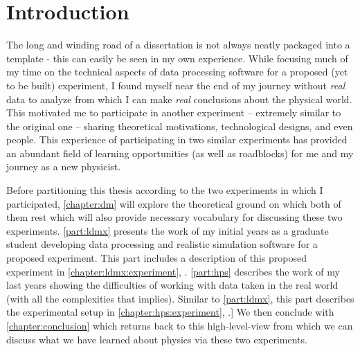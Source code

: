 \chapter{Introduction}
\label{chapter:intro}

The long and winding road of a dissertation is not always neatly packaged into a
template - this can easily be seen in my own experience. While focusing much
of my time on the technical aspects of data processing software for a proposed (yet
to be built) experiment, I found myself near the end of my journey without \emph{real}
data to analyze from which I can make \emph{real} conclusions about the physical world.
This motivated me to participate in another experiment -- extremely similar to the original
one -- sharing theoretical motivations, technological designs, and even people. This
experience of participating in two similar experiments has provided an abundant
field of learning opportunities (as well as roadblocks) for me and my journey as a new physicist.

Before partitioning this thesis according to the two experiments in which I participated,
\cref{chapter:dm} will explore the theoretical ground on which both of them rest which will
also provide necessary vocabulary for discussing these two experiments. \cref{part:ldmx} presents
the work of my initial years as a graduate student developing data processing and realistic simulation
software for a proposed experiment. This part includes a description of this proposed experiment in
\cref{chapter:ldmx:experiment}, .
\cref{part:hps} describes the work of my last years showing
the difficulties of working with data taken in the real world (with all the complexities that implies).
Similar to \cref{part:ldmx}, this part describes the experimental setup in \cref{chapter:hps:experiment},
.]
We then conclude with \cref{chapter:conclusion} which returns back to this high-level-view
from which we can discuss what we have learned about physics via these two experiments.

